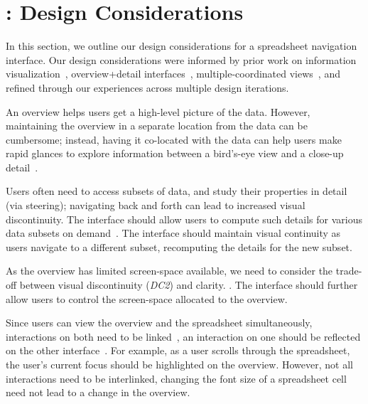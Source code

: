 \section{\noah: Design Considerations}
\label{sec:design}
In this section,
we outline our design considerations
for a spreadsheet navigation interface.
Our design considerations were
informed by prior work on
information visualization~\cite{shneiderman2003eyes,brehmer2013multi}, overview+detail interfaces~\cite{cockburn2009review}, multiple-coordinated views~\cite{wang2000guidelines},
and refined through our experiences
across multiple design iterations.

An overview helps users get a high-level picture
of the data.
However, maintaining the overview in a separate
location from the data can be cumbersome;
instead, having it co-located with the data
can help users make rapid glances to
explore information between a
bird's-eye view
and a close-up detail~\cite{grudin2001partitioning}.

Users often need to access subsets of data,
and study their properties in detail (\eg via steering);
navigating back and forth 
can lead to increased visual discontinuity.
The interface should allow users to compute such details for
various data subsets on demand~\cite{shneiderman2003eyes}.
The interface should maintain visual continuity
as users navigate to a different subset,
recomputing the details for the new subset.

As the overview
has limited screen-space available,
we need to consider the trade-off between visual discontinuity (\emph{DC2}) and clarity.
.
The interface should further allow users to control the screen-space allocated
to the overview.


Since users can view the overview
and the spreadsheet simultaneously,
interactions on both need to be linked~\cite{roberts2007state},
\ie an interaction on one should be reflected on
the other interface~\cite{wang2000guidelines}.
For example, as a user scrolls through
the spreadsheet, the user's current focus
should be highlighted on the overview.
However, not all interactions need to be interlinked,
\eg changing the font size of a spreadsheet cell
need not lead to a change in the overview.



